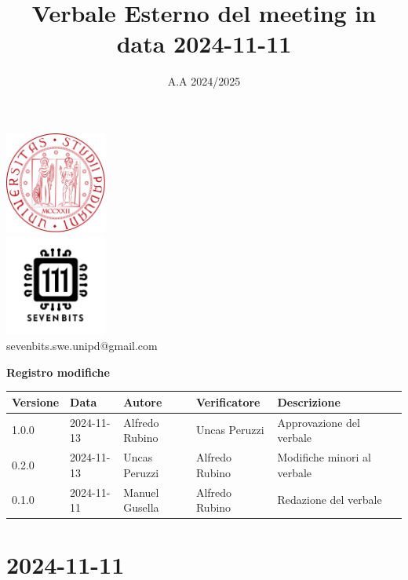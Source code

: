 \documentclass[12pt]{article}
\title{Verbale Esterno del meeting in data 2024-11-11}
\date{A.A 2024/2025}
\begin{document}
\maketitle
\begin{center}
\includegraphics[width=0.25\textwidth]{LogoUnipd}\\
\includegraphics[width=0.25\textwidth]{Sevenbitslogo}\\
sevenbits.swe.unipd@gmail.com\\
\vspace{2mm}

\textbf{Registro modifiche}\\
\vspace{2mm}
\begin{tabular}{|l|l|l|l|l|l|}
\hline
\textbf{Versione} & \textbf{Data} & \textbf{Autore} & \textbf{Verificatore} & \textbf{Descrizione} \\
\hline
1.0.0 & 2024-11-13  & Alfredo Rubino & Uncas Peruzzi & Approvazione del verbale\\
\hline
0.2.0 & 2024-11-13 & Uncas Peruzzi & Alfredo Rubino & Modifiche minori al verbale\\
\hline
0.1.0 & 2024-11-11 & Manuel Gusella & Alfredo Rubino & Redazione del verbale\\
\hline


\end{tabular}
\end{center}
\newpage
\tableofcontents
\newpage
\section{2024-11-11}
\end{document}
